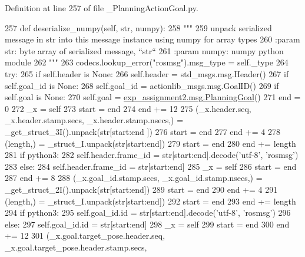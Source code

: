 Definition at line 257 of file \+\_\+\+Planning\+Action\+Goal.\+py.


\begin{DoxyCode}
257   \textcolor{keyword}{def }deserialize\_numpy(self, str, numpy):
258     \textcolor{stringliteral}{"""}
259 \textcolor{stringliteral}{    unpack serialized message in str into this message instance using numpy for array types}
260 \textcolor{stringliteral}{    :param str: byte array of serialized message, ``str``}
261 \textcolor{stringliteral}{    :param numpy: numpy python module}
262 \textcolor{stringliteral}{    """}
263     codecs.lookup\_error(\textcolor{stringliteral}{"rosmsg"}).msg\_type = self.\_type
264     \textcolor{keywordflow}{try}:
265       \textcolor{keywordflow}{if} self.header \textcolor{keywordflow}{is} \textcolor{keywordtype}{None}:
266         self.header = std\_msgs.msg.Header()
267       \textcolor{keywordflow}{if} self.goal\_id \textcolor{keywordflow}{is} \textcolor{keywordtype}{None}:
268         self.goal\_id = actionlib\_msgs.msg.GoalID()
269       \textcolor{keywordflow}{if} self.goal \textcolor{keywordflow}{is} \textcolor{keywordtype}{None}:
270         self.goal = \hyperlink{classexp__assignment2_1_1msg_1_1__PlanningGoal_1_1PlanningGoal}{exp\_assignment2.msg.PlanningGoal}()
271       end = 0
272       \_x = self
273       start = end
274       end += 12
275       (\_x.header.seq, \_x.header.stamp.secs, \_x.header.stamp.nsecs,) = \_get\_struct\_3I().unpack(str[start:end
      ])
276       start = end
277       end += 4
278       (length,) = \_struct\_I.unpack(str[start:end])
279       start = end
280       end += length
281       \textcolor{keywordflow}{if} python3:
282         self.header.frame\_id = str[start:end].decode(\textcolor{stringliteral}{'utf-8'}, \textcolor{stringliteral}{'rosmsg'})
283       \textcolor{keywordflow}{else}:
284         self.header.frame\_id = str[start:end]
285       \_x = self
286       start = end
287       end += 8
288       (\_x.goal\_id.stamp.secs, \_x.goal\_id.stamp.nsecs,) = \_get\_struct\_2I().unpack(str[start:end])
289       start = end
290       end += 4
291       (length,) = \_struct\_I.unpack(str[start:end])
292       start = end
293       end += length
294       \textcolor{keywordflow}{if} python3:
295         self.goal\_id.id = str[start:end].decode(\textcolor{stringliteral}{'utf-8'}, \textcolor{stringliteral}{'rosmsg'})
296       \textcolor{keywordflow}{else}:
297         self.goal\_id.id = str[start:end]
298       \_x = self
299       start = end
300       end += 12
301       (\_x.goal.target\_pose.header.seq, \_x.goal.target\_pose.header.stamp.secs, 

\end{DoxyCode}
